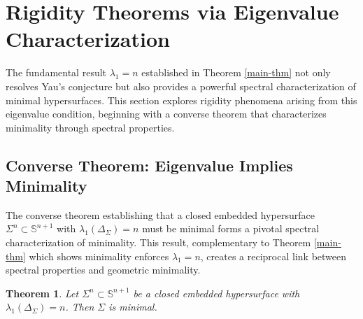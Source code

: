 \documentclass[a4, 12pt]{amsart}
\numberwithin{equation}{section} \numberwithin{equation}{section}
\newtheorem{thm}{Theorem}[section]
\begin{document}
\section{Rigidity Theorems via Eigenvalue Characterization}\label{Rigidity Theorems}

The fundamental result $\lambda_1 = n$ established in Theorem \ref{main-thm} not only resolves Yau's conjecture but also provides a powerful spectral characterization of minimal hypersurfaces. This section explores rigidity phenomena arising from this eigenvalue condition, beginning with a converse theorem that characterizes minimality through spectral properties.
\subsection{Converse Theorem: Eigenvalue Implies Minimality}

The converse theorem establishing that a closed embedded hypersurface $\Sigma^n \subset \mathbb{S}^{n+1}$ with $\lambda_1(\Delta_\Sigma) = n$ must be minimal forms a pivotal spectral characterization of minimality. This result, complementary to Theorem \ref{main-thm} which shows minimality enforces $\lambda_1 = n$, creates a reciprocal link between spectral properties and geometric minimality.
\begin{thm}\label{converse-thm}
Let $\Sigma^n \subset \mathbb{S}^{n+1}$ be a closed embedded hypersurface with $\lambda_1(\Delta_\Sigma) = n$. Then $\Sigma$ is minimal.
\end{thm}
\end{document}

